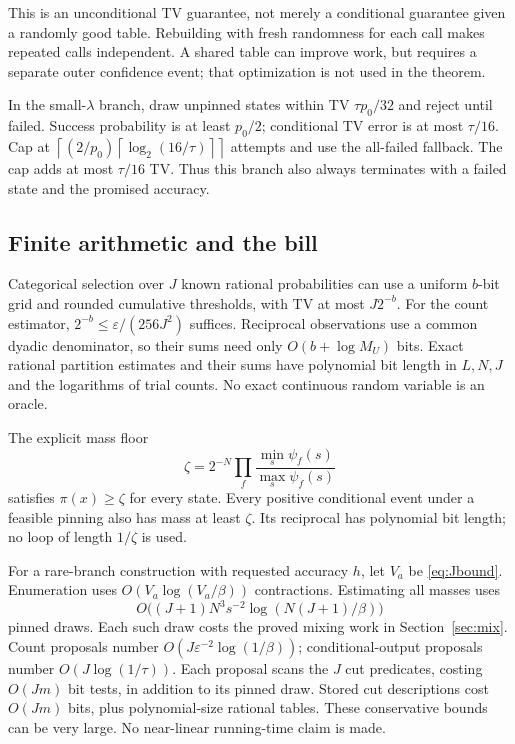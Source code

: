 \documentclass[11pt]{article}
\newcommand{\ceil}[1]{\left\lceil #1\right\rceil}
\newcommand{\eps}{\varepsilon}
\begin{document}
This is an unconditional TV guarantee, not merely a conditional guarantee given a randomly good table. Rebuilding with fresh randomness for each call makes repeated calls independent. A shared table can improve work, but requires a separate outer confidence event; that optimization is not used in the theorem.

In the small-$\lambda$ branch, draw unpinned states within TV $\tau p_0/32$ and reject until failed. Success probability is at least $p_0/2$; conditional TV error is at most $\tau/16$. Cap at $\ceil{(2/p_0)\ceil{\log_2(16/\tau)}}$ attempts and use the all-failed fallback. The cap adds at most $\tau/16$ TV. Thus this branch also always terminates with a failed state and the promised accuracy.

\subsection{Finite arithmetic and the bill}
Categorical selection over $J$ known rational probabilities can use a uniform $b$-bit grid and rounded cumulative thresholds, with TV at most $J2^{-b}$. For the count estimator, $2^{-b}\le\eps/(256J^2)$ suffices. Reciprocal observations use a common dyadic denominator, so their sums need only $O(b+\log M_U)$ bits. Exact rational partition estimates and their sums have polynomial bit length in $L,N,J$ and the logarithms of trial counts. No exact continuous random variable is an oracle.

The explicit mass floor
\begin{equation}
 \zeta=2^{-N}\prod_f\frac{\min_s\psi_f(s)}{\max_s\psi_f(s)}
 \label{eq:massfloor}
\end{equation}
satisfies $\pi(x)\ge\zeta$ for every state. Every positive conditional event under a feasible pinning also has mass at least $\zeta$. Its reciprocal has polynomial bit length; no loop of length $1/\zeta$ is used.

For a rare-branch construction with requested accuracy $h$, let $V_a$ be \eqref{eq:Jbound}. Enumeration uses $O(V_a\log(V_a/\beta))$ contractions. Estimating all masses uses
\[
 O\bigl((J+1)N^3s^{-2}\log(N(J+1)/\beta)\bigr)
\]
pinned draws. Each such draw costs the proved mixing work in Section~\ref{sec:mix}. Count proposals number $O(J\eps^{-2}\log(1/\beta))$; conditional-output proposals number $O(J\log(1/\tau))$. Each proposal scans the $J$ cut predicates, costing $O(Jm)$ bit tests, in addition to its pinned draw. Stored cut descriptions cost $O(Jm)$ bits, plus polynomial-size rational tables. These conservative bounds can be very large. No near-linear running-time claim is made.
\end{document}
